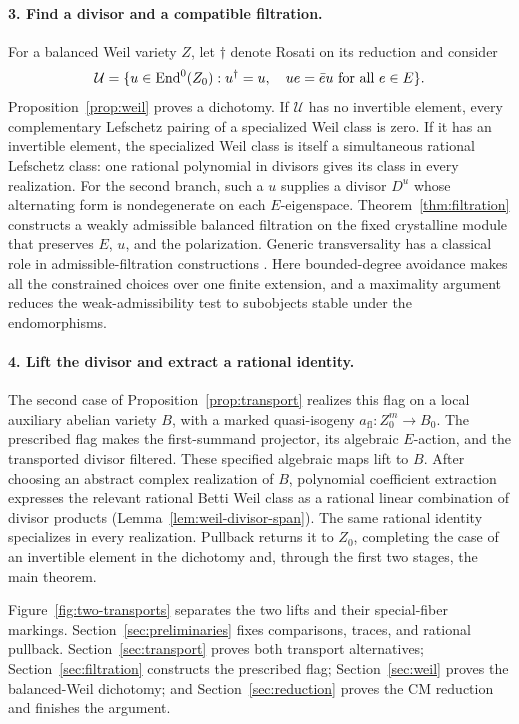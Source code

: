 \paragraph{3. Find a divisor and a compatible filtration.}
For a balanced Weil variety \(Z\), let \(\dagger\) denote Rosati on its
reduction and consider
\[
 \mathcal U=\{u\in\operatorname{End}^0(Z_0):u^\dagger=u,\quad
                         ue=\bar e u\text{ for all }e\in E\}.
\]
Proposition~\ref{prop:weil} proves a dichotomy. If \(\mathcal U\) has no
invertible element, every complementary Lefschetz pairing of a
specialized Weil class is zero. If it has an invertible element, the
specialized Weil class is itself a simultaneous rational Lefschetz
class: one rational polynomial in divisors gives its class in every
realization. For the second branch, such a \(u\) supplies a divisor
\(D^u\) whose alternating form is nondegenerate on each \(E\)-eigenspace.
Theorem~\ref{thm:filtration} constructs a weakly admissible balanced
filtration on the fixed crystalline module that preserves \(E\), \(u\),
and the polarization. Generic transversality has a classical role in
admissible-filtration constructions
\cite[Theorem~1 and Lemmas~1.1--1.2]{FontaineRapoport2005}.
Here bounded-degree avoidance makes all the constrained choices over
one finite extension, and a maximality argument reduces the
weak-admissibility test to subobjects stable under the endomorphisms.

\paragraph{4. Lift the divisor and extract a rational identity.}
The second case of Proposition~\ref{prop:transport} realizes this flag
on a local auxiliary abelian variety \(B\), with a marked quasi-isogeny
\(a_{\mathrm{fl}}:Z_0^m\to B_0\). The prescribed flag makes the
first-summand projector, its algebraic \(E\)-action, and the transported
divisor filtered. These specified algebraic maps lift to \(B\).
After choosing an abstract complex realization of \(B\), polynomial
coefficient extraction expresses the relevant rational Betti Weil class
as a rational linear combination of divisor products
(Lemma~\ref{lem:weil-divisor-span}). The same rational identity specializes
in every realization. Pullback returns it to \(Z_0\), completing the
case of an invertible element in the dichotomy and, through the first two stages, the
main theorem.

Figure~\ref{fig:two-transports} separates the two lifts and their
special-fiber markings. Section~\ref{sec:preliminaries} fixes comparisons,
traces, and rational pullback. Section~\ref{sec:transport} proves both
transport alternatives; Section~\ref{sec:filtration} constructs the
prescribed flag; Section~\ref{sec:weil} proves the balanced-Weil dichotomy;
and Section~\ref{sec:reduction} proves the CM reduction and finishes the
argument.

